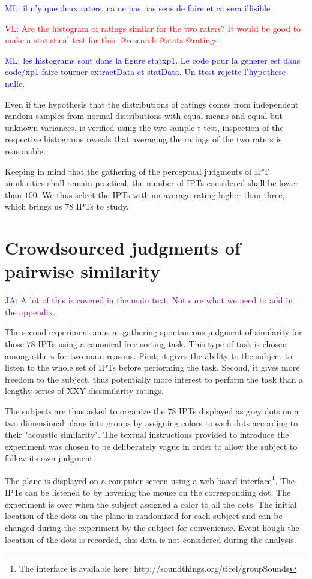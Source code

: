 \documentclass{bmcart}
\newcommand{\ipt}{IPT\xspace}
\newcommand{\ipts}{IPTs\xspace}
\newcommand{\ml}[1]{\textcolor{blue}{ML: #1}}
\newcommand{\vl}[1]{\textcolor{red}{VL: #1}}
\newcommand{\ja}[1]{\textcolor{purple}{JA: #1}}
\begin{document}
\begin{backmatter}
\ml{il n'y que deux raters, ca ne pas pas sens de faire et ca sera illisible}

\vl{Are the histogram of ratings similar for the two raters? It would be good to make a statistical test for this. @research @stats @ratings}

\ml{les histograms sont dans la figure statxp1. Le code pour la generer est dans code/xp1 faire tourner extractData et statData. Un ttest rejette l'hypothese nulle.}

Even if the hypothesis that the distributions of ratings comes from independent random samples from normal distributions with equal means and equal but unknown variances, is verified using the two-sample t-test, inspection of the respective histograms reveals that averaging the ratings of the two raters is reasonable.

Keeping in mind that the gathering of the perceptual judgments of \ipt similarities shall remain practical, the number of \ipts considered shall be lower than $100$. We thus select the \ipts with an average rating higher than three, which brings us 78 \ipts to study.

\section*{Crowdsourced judgments of pairwise similarity}

\ja{A lot of this is covered in the main text.
Not sure what we need to add in the appendix.}

The second experiment aims at gathering spontaneous judgment of similarity for those 78 \ipts using a canonical free sorting task. This type of task is chosen among others for two main reasons. First, it gives the ability to the subject to listen to the whole set of \ipts before performing the task. Second, it gives more freedom to the subject, thus potentially more interest to perform the task than a lengthy series of XXY dissimilarity ratings.

The subjects are thus asked to organize the 78 \ipts displayed as grey dots on a two dimensional plane into groups by assigning colors to each dots according to their "acoustic similarity". The textual instructions provided to introduce the experiment was chosen to be deliberately vague in order to allow the subject to follow its own judgment.

The plane is displayed on a computer screen using a web based interface\footnote{The interface is available here: http://soundthings.org/ticel/groupSounds}. The \ipts can be listened to by hovering the mouse on the corresponding dot. The experiment is over when the subject assigned a color to all the dots. The initial location of the dots on the plane is randomized for each subject and can be changed during the experiment by the subject for convenience. Event hough the location of the dots is recorded, this data is not considered during the analysis.


\end{backmatter}
\end{document}
